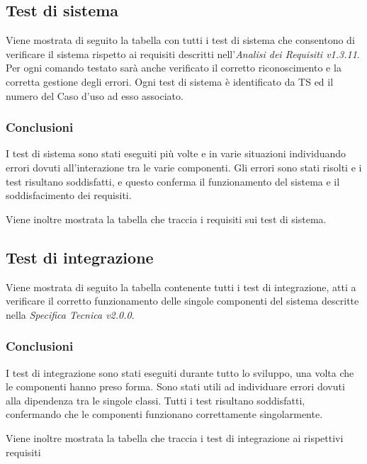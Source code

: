\documentclass[a4paper]{article}
\begin{document}
					
	\subsection{Test di sistema}
		Viene mostrata di seguito la tabella con tutti i test di sistema che consentono di verificare il sistema rispetto ai requisiti descritti nell'\emph{Analisi dei Requisiti v1.3.11}.
		Per ogni comando testato sarà anche verificato il corretto riconoscimento e la corretta gestione degli errori.
		Ogni test di sistema è identificato da TS ed il numero del Caso d'uso ad esso associato.
		\subsubsection{Conclusioni}
			I test di sistema sono stati eseguiti più volte e in varie situazioni individuando errori dovuti all'interazione tra le varie componenti. Gli errori sono stati risolti e i test risultano soddisfatti, e questo conferma il funzionamento del sistema e il soddisfacimento dei requisiti.
		
		Viene inoltre mostrata la tabella che traccia i requisiti sui test di sistema.
		
	\subsection{Test di integrazione}
		Viene mostrata di seguito la tabella contenente tutti i test di integrazione, atti a verificare il corretto funzionamento delle singole componenti del sistema descritte nella \emph{Specifica Tecnica v2.0.0}. 
		
		\subsubsection{Conclusioni}
		I test di integrazione sono stati eseguiti durante tutto lo sviluppo, una volta che le componenti hanno preso forma. Sono stati utili ad individuare errori dovuti alla dipendenza tra le singole classi. Tutti i test risultano soddisfatti, confermando che le componenti funzionano correttamente singolarmente. 
		
		Viene inoltre mostrata la tabella che traccia i test di integrazione ai rispettivi requisiti
	
\end{document}
